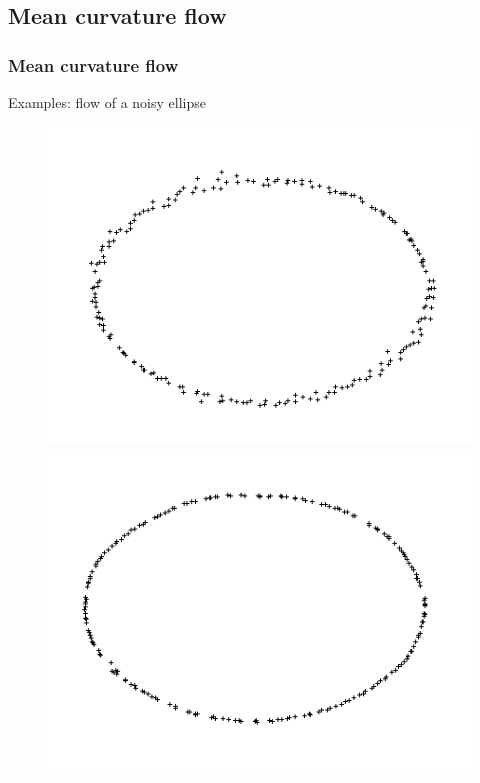 \documentclass{beamer}
\begin{document}
\subsection{Mean curvature flow}
\begin{frame}
    \frametitle{Mean curvature flow}

    Examples: flow of a noisy ellipse
    \begin{figure}
        \centering
        \includegraphics[scale=0.22]{img/ellipse-200-noised-var-1-area}
        \includegraphics[scale=0.22]{img/ellipse-noised-area-5-01}


\end{figure}
\end{frame}
\end{document}
